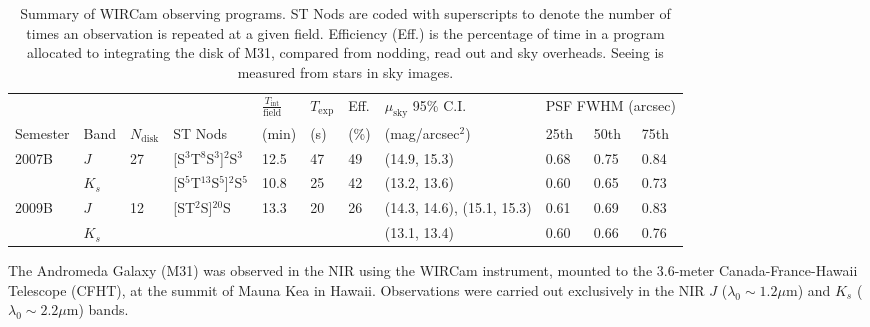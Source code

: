 \documentclass[iop]{emulateapj}
\begin{document}
\begin{table}[t]
    \caption[Summary of WIRCam observing programs]{Summary of WIRCam observing programs. ST Nods are coded with superscripts to denote the number of times an observation is repeated at a given field. Efficiency (Eff.) is the percentage of time in a program allocated to integrating the disk of M31, compared from nodding, read out and sky overheads. Seeing is measured from stars in sky images.}
    \label{tab:obssummary}
    
    \centering
    \begin{tabular}{lllllllllll}
        & & & & $\frac{T_\mathrm{int}}{\mathrm{field}}$ & $T_\mathrm{exp}$ & Eff. & $\mu_\mathrm{sky}$ 95\% C.I. & \multicolumn{3}{c}{PSF FWHM (arcsec)} \\ \cline{9-11}
    Semester & Band & $N_\mathrm{disk}$ & ST Nods & (min) &  (s) &  (\%) & (mag/arcsec$^2$) & 25th  & 50th & 75th \\
    \hline
    \multirow{2}{*}{2007B} & $J$ & \multirow{2}{*}{27} & [S$^3$T$^8$S$^3$]$^{2}$S$^3$ & 12.5 & 47 & 49 & (14.9, 15.3) & 0.68 & 0.75 & 0.84 \\
     & $K_s$ &  & [S$^5$T$^{13}$S$^5$]${^2}$S$^5$ & 10.8 & 25 & 42 & (13.2, 13.6) & 0.60 &  0.65 & 0.73 \\
     \hline
     \multirow{2}{*}{2009B} & $J$ & \multirow{2}{*}{12} & \multirow{2}{*}{[ST$^2$S]$^{20}$S} & \multirow{2}{*}{13.3} & \multirow{2}{*}{20} & \multirow{2}{*}{26} & (14.3, 14.6), (15.1, 15.3) & 0.61 & 0.69 & 0.83 \\
      & $K_s$ & & & & & & (13.1, 13.4) & 0.60 & 0.66 & 0.76 \\
    \end{tabular}
\end{table}


The Andromeda Galaxy (M31) was observed in the NIR using the WIRCam instrument, mounted to the 3.6-meter Canada-France-Hawaii Telescope (CFHT), at the summit of Mauna Kea in Hawaii. Observations were carried out exclusively in the NIR $J$ ($\lambda_0 \sim 1.2 \mu\mathrm{m}$) and $K_s$ ($\lambda_0 \sim 2.2 \mu\mathrm{m}$) bands.
\end{document}
